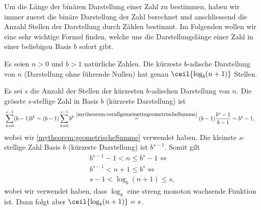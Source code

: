 Um die Länge der binären Darstellung einer Zahl zu bestimmen, haben wir immer zuerst die binäre Darstellung der Zahl berechnet und anschliessend die Anzahl Stellen der Darstellung durch Zählen bestimmt. Im Folgenden wollen wir eine sehr wichtige Formel finden, welche uns die Darstellungslänge einer Zahl in einer beliebigen Basis $b$ sofort gibt.

\begin{mytheorem}\label{mytheorem:AnzahlZiffern}
	Es seien $n>0$ und $b>1$ natürliche Zahlen. Die kürzeste $b$-adische Darstellung von $n$ (Darstellung ohne führende Nullen) hat genau $\ceil{\log_b(n + 1)}$ Stellen.
	\begin{myproof}
		Es sei $s$ die Anzahl der Stellen der kürzesten $b$-adischen Darstellung von $n$. Die grösste $s$-stellige Zahl in Basis $b$ (kürzeste Darstellung) ist
		\begin{align*}
			 & \sum_{k = 0}^{s-1} (b-1)b^{k} = (b-1)\sum_{k = 0}^{s-1} b^{k} \stackrel{\cref{mytheorem:verallgemeinertegeometrischeSumme}}{=} (b-1)\frac{b^s - 1}{b - 1} = b^s - 1,
		\end{align*}
		wobei wir \cref{mytheorem:geometrischeSumme} verwendet haben. Die kleinste $s$-stellige Zahl Basis $b$ (kürzeste Darstellung) ist $b^{s-1}$. Somit gilt
		\begin{align*}
			b^{s-1} - 1 < n \leq b^s - 1 \iff \\
			b^{s-1} < n + 1 \leq b^s \iff     \\
			s-1 < \log_b(n+1) \leq s,
		\end{align*}
		wobei wir verwendet haben, dass $\log_b$ eine streng monoton wachsende Funktion ist.
		Dann folgt aber $\ceil{\log_b(n + 1)} = s$.
	\end{myproof}
\end{mytheorem}

